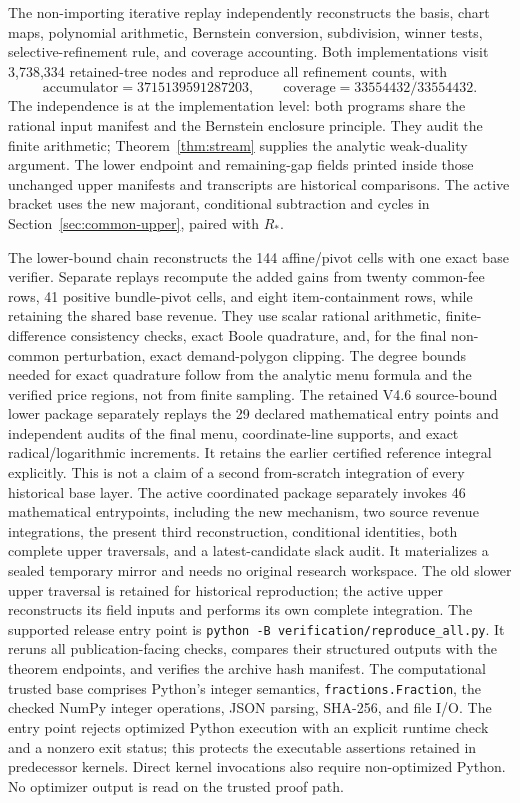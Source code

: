 \documentclass[11pt]{article}
\begin{document}
The non-importing iterative replay independently reconstructs the basis, chart
maps, polynomial arithmetic, Bernstein conversion, subdivision, winner tests,
selective-refinement rule, and coverage accounting.  Both implementations
visit 3,738,334 retained-tree nodes and reproduce all refinement counts, with
\[
\text{accumulator}=3715139591287203,\qquad
\text{coverage}=33554432/33554432.
\]
The independence is at the implementation level: both programs share the
rational input manifest and the Bernstein enclosure principle.  They audit
the finite arithmetic; Theorem~\ref{thm:stream} supplies the analytic
weak-duality argument. The lower endpoint and remaining-gap fields printed
inside those unchanged upper manifests and transcripts are historical
comparisons. The active bracket uses the new majorant, conditional subtraction and
cycles in Section~\ref{sec:common-upper}, paired with $R_*$.

The lower-bound chain reconstructs the 144 affine/pivot cells with one exact
base verifier.  Separate replays recompute the added gains from twenty
common-fee rows, 41 positive bundle-pivot cells, and eight item-containment
rows, while retaining the shared base revenue.  They use scalar rational
arithmetic, finite-difference consistency checks, exact Boole quadrature,
and, for the final non-common perturbation, exact demand-polygon clipping.
The degree bounds needed for exact quadrature follow from the analytic menu
formula and the verified price regions, not from finite sampling.
The retained V4.6 source-bound lower package separately replays the 29 declared
mathematical entry points and independent audits of the final menu,
coordinate-line supports, and exact radical/logarithmic increments. It
retains the earlier certified reference integral explicitly. This is not a
claim of a second from-scratch integration of every historical base layer.
The active coordinated package separately invokes 46 mathematical entrypoints,
including the new mechanism, two source revenue integrations, the present
third reconstruction, conditional identities, both complete upper traversals,
and a latest-candidate slack audit. It materializes a sealed temporary mirror
and needs no original research workspace. The old slower upper traversal is
retained for historical reproduction; the active upper reconstructs its field
inputs and performs its own complete integration. The supported release entry point is
\texttt{python -B verification/reproduce\_all.py}.  It reruns all
publication-facing checks,
compares their structured outputs with the theorem endpoints, and verifies the
archive hash manifest.  The computational trusted base comprises Python's
integer semantics, \texttt{fractions.Fraction}, the checked NumPy integer
operations, JSON parsing, SHA-256, and file I/O.  The entry point rejects
optimized Python execution with an explicit runtime check and a nonzero exit
status; this protects the executable assertions retained in predecessor
kernels.  Direct kernel invocations also require non-optimized Python.
No optimizer output is read on the trusted proof path.
\end{document}
